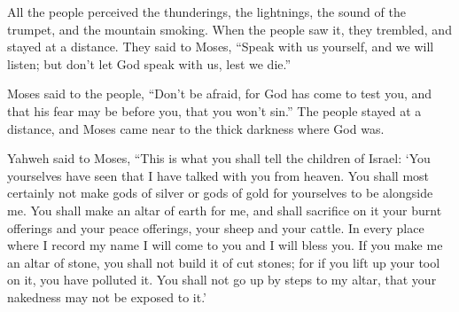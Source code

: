 {\par }{\PP {}All the people perceived the thunderings, the lightnings, the sound of the trumpet, and the mountain smoking. When the people saw it, they trembled, and stayed at a distance.
They said to Moses, “Speak with us yourself, and we will listen; but don’t let God speak with us, lest we die.”
\par }{\PP {}Moses said to the people, “Don’t be afraid, for God has come to test you, and that his fear may be before you, that you won’t sin.”
The people stayed at a distance, and Moses came near to the thick darkness where God was.
\par }{\PP {}Yahweh said to Moses, “This is what you shall tell the children of Israel: ‘You yourselves have seen that I have talked with you from heaven.
You shall most certainly not make gods of silver or gods of gold for yourselves to be alongside me.
You shall make an altar of earth for me, and shall sacrifice on it your burnt offerings and your peace offerings, your sheep and your cattle. In every place where I record my name I will come to you and I will bless you.
If you make me an altar of stone, you shall not build it of cut stones; for if you lift up your tool on it, you have polluted it.
You shall not go up by steps to my altar, that your nakedness may not be exposed to it.’

}
